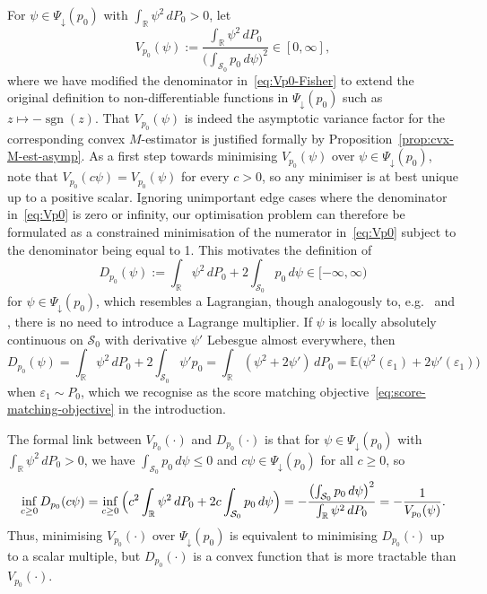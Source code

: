 \documentclass[a4paper]{article}
\newcommand{\R}{\mathbb{R}}
\newcommand{\E}{\mathbb{E}}
\DeclareMathOperator{\sgn}{sgn}
\theoremstyle{definition}
\begin{document}
For $\psi \in \Psi_\downarrow(p_0)$ with $\int_\R \psi^2\,dP_0 > 0$, let
\begin{equation}
\label{eq:Vp0}
V_{p_0}(\psi) := \frac{\int_\R\psi^2\,dP_0}{\bigl(\int_{\mathcal{S}_0}p_0\,d\psi\bigr)^2} \in [0,\infty],
\end{equation}
where we have modified the denominator in~\eqref{eq:Vp0-Fisher} to extend the original definition to non-differentiable functions in $\Psi_\downarrow(p_0)$ such as $z \mapsto -\sgn(z)$. That $V_{p_0}(\psi)$ is indeed the asymptotic variance factor for the corresponding convex $M$-estimator is justified formally by Proposition~\ref{prop:cvx-M-est-asymp}.  As a first step towards minimising $V_{p_0}(\psi)$ over $\psi \in \Psi_\downarrow(p_0)$, note that $V_{p_0}(c\psi) = V_{p_0}(\psi)$ for every $c > 0$, so any minimiser is at best unique up to a positive scalar.  Ignoring unimportant edge cases where the denominator in~\eqref{eq:Vp0} is zero or infinity, our optimisation problem can therefore be formulated as a constrained minimisation of the numerator in~\eqref{eq:Vp0} subject to the denominator being equal to 1. This motivates the definition of
\begin{equation}
\label{eq:score-matching-obj}
D_{p_0}(\psi) := \int_\R \psi^2\,dP_0 + 2\int_{\mathcal{S}_0} p_0\,d\psi \in [-\infty,\infty)
\end{equation}
for $\psi \in \Psi_\downarrow(p_0)$, which resembles a Lagrangian, though analogously to, e.g.~\citet[p.~798]{silverman82estimation} and \citet[][p.~705]{dumbgen2011approximation}, there is no need to introduce a Lagrange multiplier. If $\psi$ is locally absolutely continuous on $\mathcal{S}_0$ with derivative $\psi'$ Lebesgue almost everywhere, then
\begin{equation}
\label{eq:Dp0-deriv}
D_{p_0}(\psi) = \int_\R \psi^2\,dP_0 + 2\int_{\mathcal{S}_0} \psi'p_0 = \int_\R (\psi^2 + 2\psi')\,dP_0 = \E\bigl(\psi^2(\varepsilon_1) + 2\psi'(\varepsilon_1)\bigr)
\end{equation}
when $\varepsilon_1 \sim P_0$, which we recognise as the score matching objective~\eqref{eq:score-matching-objective} in the introduction.

The formal link between $V_{p_0}(\cdot)$ and $D_{p_0}(\cdot)$ is that for $\psi \in \Psi_\downarrow(p_0)$ with $\int_\R \psi^2\,dP_0 > 0$, we have $\int_{\mathcal{S}_0}p_0\,d\psi \leq 0$ and $c\psi \in \Psi_\downarrow(p_0)$ for all $c \geq 0$, so
\begin{equation}
\label{eq:V-D-equivalence}
\inf_{c \geq 0}D_{p_0}(c\psi) = \inf_{c \geq 0}\,\Bigl(c^2\int_\R\psi^2\,dP_0 + 2c\int_{\mathcal{S}_0}p_0\,d\psi\Bigr) = -\frac{\bigl(\int_{\mathcal{S}_0}p_0\,d\psi\bigr)^2}{\int_\R\psi^2\,dP_0} = -\frac{1}{V_{p_0}(\psi)}.
\end{equation}
Thus, minimising $V_{p_0}(\cdot)$ over $\Psi_\downarrow(p_0)$ is equivalent to minimising $D_{p_0}(\cdot)$ up to a scalar multiple, but $D_{p_0}(\cdot)$ is a convex function that is more tractable than $V_{p_0}(\cdot)$.
\end{document}
